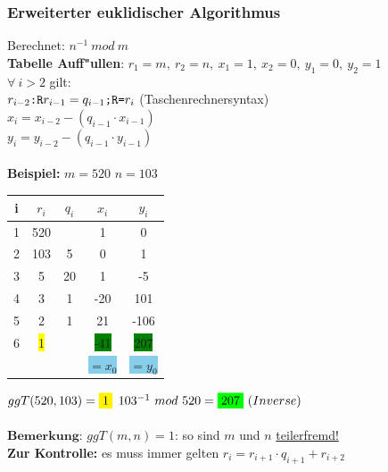 \documentclass[10pt,a4paper,landscape]{article}
\begin{document}
\begin{multicols*}{3}
		\subsubsection{Erweiterter euklidischer Algorithmus}
		Berechnet: $n^{-1}~mod~m$
		\\\textbf{Tabelle Auff"ullen}:
		$r_1 = m,~r_2 = n,~x_1=1,~x_2=0,~y_1=0,~y_2=1$\\
		$\forall~i > 2$ gilt: \\
		$r_{i-2}\verb|:R|r_{i-1} = q_{i-1}\verb|;R=|r_{i}$ (Taschenrechnersyntax)\\
		${x}_i = {x}_{i-2} - (q_{i-1} \cdot  {x}_{i-1} ) $\\
		${y}_i = {y}_{i-2} - (q_{i-1} \cdot  {y}_{i-1} ) $\\
		\\
		\textbf{Beispiel:} $m = 520$ $n = 103$
		\begin{center} 
			\begin{tabular}{ c c c c c }
				i & $r_i$                & $q_i$ & $x_i$                       & $y_i$                       \\
				\hline
				1 & 520                  &       & \colorbox{CarnationPink}{1} & \colorbox{CarnationPink}{0} \\
				2 & 103                  & 5     & \colorbox{CarnationPink}{0} & \colorbox{CarnationPink}{1} \\
				3 & 5                    & 20    & 1                           & -5                          \\
				4 & 3                    & 1     & -20                         & 101                         \\
				5 & 2                    & 1     & 21                          & -106                        \\
				6 & \colorbox{yellow}{1} &       & \colorbox{green}{-41}       & \colorbox{green}{207}       \\
				  &                      &       & \colorbox{SkyBlue}{$=x_0$}  & \colorbox{SkyBlue}{$=y_0$}  \\
			\end{tabular}
		\end{center}
		$ggT(520, 103) = \colorbox{yellow}{1}$ \hfill $103^{-1}~mod~520=\colorbox{green}{207}~(Inverse)$\\
		\\
		$\textbf{Bemerkung:}$ $ggT(m, n) = 1$: so sind $m$ und $n$ \uline{teilerfremd!}\\
		\textbf{Zur Kontrolle:} es muss immer gelten $r_i = r_{i+1} \cdot q_{i+1} + r_{i+2}$
		

\end{multicols*}
\end{document}
